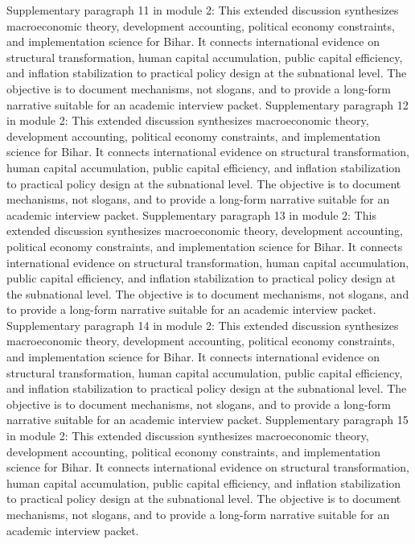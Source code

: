 \documentclass[preprint,12pt]{elsarticle}
\begin{document}
Supplementary paragraph 11 in module 2: This extended discussion synthesizes macroeconomic theory, development accounting, political economy constraints, and implementation science for Bihar. It connects international evidence on structural transformation, human capital accumulation, public capital efficiency, and inflation stabilization to practical policy design at the subnational level. The objective is to document mechanisms, not slogans, and to provide a long-form narrative suitable for an academic interview packet.
Supplementary paragraph 12 in module 2: This extended discussion synthesizes macroeconomic theory, development accounting, political economy constraints, and implementation science for Bihar. It connects international evidence on structural transformation, human capital accumulation, public capital efficiency, and inflation stabilization to practical policy design at the subnational level. The objective is to document mechanisms, not slogans, and to provide a long-form narrative suitable for an academic interview packet.
Supplementary paragraph 13 in module 2: This extended discussion synthesizes macroeconomic theory, development accounting, political economy constraints, and implementation science for Bihar. It connects international evidence on structural transformation, human capital accumulation, public capital efficiency, and inflation stabilization to practical policy design at the subnational level. The objective is to document mechanisms, not slogans, and to provide a long-form narrative suitable for an academic interview packet.
Supplementary paragraph 14 in module 2: This extended discussion synthesizes macroeconomic theory, development accounting, political economy constraints, and implementation science for Bihar. It connects international evidence on structural transformation, human capital accumulation, public capital efficiency, and inflation stabilization to practical policy design at the subnational level. The objective is to document mechanisms, not slogans, and to provide a long-form narrative suitable for an academic interview packet.
Supplementary paragraph 15 in module 2: This extended discussion synthesizes macroeconomic theory, development accounting, political economy constraints, and implementation science for Bihar. It connects international evidence on structural transformation, human capital accumulation, public capital efficiency, and inflation stabilization to practical policy design at the subnational level. The objective is to document mechanisms, not slogans, and to provide a long-form narrative suitable for an academic interview packet.
\end{document}
